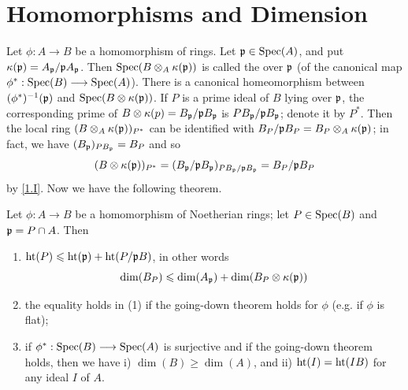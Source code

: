 \documentclass[../main]{subfiles}
\begin{document}
\section{Homomorphisms and Dimension}\label{sec:13}

\newparagraph Let $\phi: A \longrightarrow B$ be a homomorphism of rings. Let $\mathfrak{p} \in\operatorname{Spec}(A)$, and put $\kappa(\mathfrak{p})=A_{\mathfrak{p}} /\mathfrak{p}A_{\mathfrak{p}}$. Then $\operatorname{Spec}(B\otimes_A\kappa(\mathfrak{p}))$ is called the  over $\mathfrak{p}$ (of the canonical map $\phi^\ast: \operatorname{Spec}(B) \longrightarrow\operatorname{Spec}(A)$). There is a canonical homeomorphism between $(\phi^\ast)^{-1}(\mathfrak{p})$ and $\operatorname{Spec}(B \otimes \kappa(\mathfrak{p}))$. If $P$ is a prime ideal of $B$ lying over $\mathfrak{p}$, the corresponding prime of $B \otimes \kappa(p)=B_{\mathfrak{p}} / \mathfrak{p}B_{\mathfrak{p}}$ is $PB_{\mathfrak{p}} / \mathfrak{p}B_{\mathfrak{p}}$; denote it by $P^*$. Then the local ring $(B \otimes_A \kappa(\mathfrak{p}))_{P^*}$ can be identified with $B_P / \mathfrak{p}B_P=B_P\otimes_A \kappa(\mathfrak{p})$; in fact, we have $(B_{\mathfrak{p}})_{PB_{\mathfrak{p}}}=B_P$ and so \[(B \otimes \kappa(\mathfrak{p}))_{P^*}=(B_{\mathfrak{p}} / \mathfrak{p}B_{\mathfrak{p}})_{PB_{\mathfrak{p}}/\mathfrak{p}B_{\mathfrak{p}}}=B_P /\mathfrak{p}B_P\] by \ref{1.I}. Now we have the following theorem.

\begin{partheorem}\label{thm:019}
Let $\phi: A\longrightarrow B$ be a homomorphism of Noetherian rings; let $P \in \operatorname{Spec}(B)$ and $\mathfrak{p}=P \cap A$. Then
\begin{enumerate}[label=(\arabic*)]
    \item $\operatorname{ht}(P)\leqslant\operatorname{ht}(\mathfrak{p})+\operatorname{ht}(P/\mathfrak{p}B)$, in other words \[\operatorname{dim}(B_P) \leqslant \operatorname{dim}(A_{\mathfrak{p}})+\operatorname{dim}(B_P \otimes \kappa(\mathfrak{p}))\]

    \item the equality holds in (1) if the going-down theorem holds for $\phi$ (e.g. if $\phi$ is flat);

    \item if $\phi^\ast:\operatorname{Spec}(B)\longrightarrow \operatorname{Spec}(A)$ is surjective and if the going-down theorem holds, then we have i) $\dim(B) \geqslant \dim(A)$, and ii) $\operatorname{ht}(I)=\operatorname{ht}(IB)$ for any ideal $I$ of $A$.
\end{enumerate}
\end{partheorem}
\end{document}
